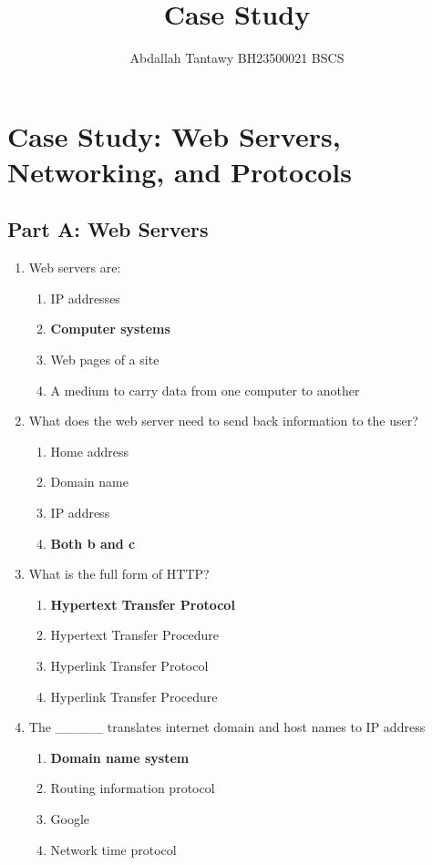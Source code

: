 \documentclass{article}
\title{Case Study}
\author{Abdallah Tantawy \quad BH23500021 \quad BSCS}
\begin{document}
\maketitle


\section*{Case Study: Web Servers, Networking, and Protocols}

\subsection*{Part A: Web Servers}

\begin{enumerate}[label=\arabic*.]
    \item Web servers are:
          \begin{enumerate}
              \item IP addresses
              \item \textbf{Computer systems}
              \item Web pages of a site
              \item A medium to carry data from one computer to another
          \end{enumerate}

    \item What does the web server need to send back information to the user?
          \begin{enumerate}
              \item Home address
              \item Domain name
              \item IP address
              \item \textbf{Both b and c}
          \end{enumerate}

    \item What is the full form of HTTP?
          \begin{enumerate}
              \item \textbf{Hypertext Transfer Protocol}
              \item Hypertext Transfer Procedure
              \item Hyperlink Transfer Protocol
              \item Hyperlink Transfer Procedure
          \end{enumerate}

    \item The \_\_\_\_\_ translates internet domain and host names to IP address
          \begin{enumerate}
              \item \textbf{Domain name system}
              \item Routing information protocol
              \item Google
              \item Network time protocol
          \end{enumerate}


\end{enumerate}
\end{document}
